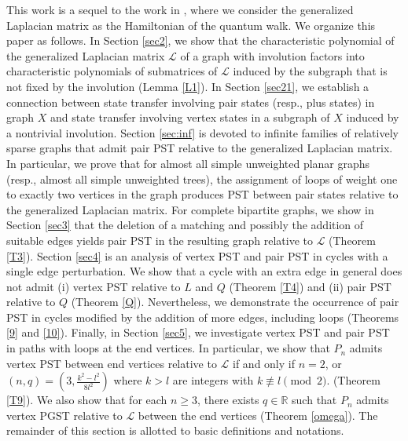 \documentclass[12pt,a4paper]{article}
\begin{document}
This work is a sequel to the work in \cite{sarojini3, pal7}, where we consider the generalized Laplacian matrix as the Hamiltonian of the quantum walk. We organize this paper as follows. In Section \ref{sec2}, we show that the characteristic polynomial of the generalized Laplacian matrix $\mathscr{L}$ of a graph with involution factors into characteristic polynomials of submatrices of $\mathscr{L}$ induced by the subgraph that is not fixed by the involution (Lemma \ref{L1}). In Section \ref{sec21}, we establish a connection between state transfer involving pair states (resp., plus states) in graph $X$ and state transfer involving vertex states in a subgraph of $X$ induced by a nontrivial involution. Section \ref{sec:inf} is devoted to infinite families of relatively sparse graphs that admit pair PST relative to the generalized Laplacian matrix. In particular, we prove that for almost all simple unweighted planar graphs (resp., almost all simple unweighted trees), the assignment of loops of weight one to exactly two vertices in the graph produces PST between pair states relative to the generalized Laplacian matrix. For complete bipartite graphs, we show in Section \ref{sec3} that the deletion of a matching and possibly the addition of suitable edges yields pair PST in the resulting graph relative to $\mathscr{L}$ (Theorem \ref{T3}). Section \ref{sec4} is an analysis of vertex PST and pair PST in cycles with a single edge perturbation. We show that a cycle with an extra edge in general does not admit (i) vertex PST relative to $L$ and $Q$ (Theorem \ref{T4}) and (ii) pair PST relative to $Q$ (Theorem \ref{Q}). Nevertheless, we demonstrate the occurrence of pair PST in cycles modified by the addition of more edges, including loops (Theorems \ref{9} and \ref{10}). Finally, in Section \ref{sec5}, we investigate vertex PST and pair PST in paths with loops at the end vertices. In particular, we show that $P_n$ admits vertex PST between end vertices relative to $\mathscr{L}$ if and only if $n =2$, or $(n,q)=(3,\frac{k^2-l^2}{8l^2})$ where $k>l$ are integers with $k \not\equiv l \pmod{2}$. (Theorem \ref{T9}). We also show that for each $n\geq 3$, there exists $q \in \mathbb{R}$ such that $P_n$ admits vertex PGST relative to $\mathscr{L}$ between the end vertices (Theorem \ref{omega}). The remainder of this section is allotted to basic definitions and notations.
 
\end{document}
